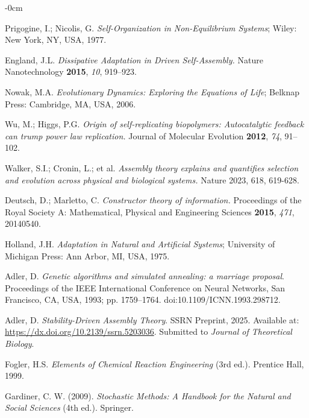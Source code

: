\documentclass[life,article,submit,pdftex,moreauthors]{Definitions/mdpi}
\begin{document}
\begin{adjustwidth}{-\extralength}{0cm}
{\begin{thebibliography}{999}
Prigogine, I.; Nicolis, G. \textit{Self-Organization in Non-Equilibrium Systems}; Wiley: New York, NY, USA, 1977.

England, J.L. \textit{Dissipative Adaptation in Driven Self-Assembly.} Nature Nanotechnology \textbf{2015}, \textit{10}, 919–923.

Nowak, M.A. \textit{Evolutionary Dynamics: Exploring the Equations of Life}; Belknap Press: Cambridge, MA, USA, 2006.


Wu, M.; Higgs, P.G. \textit{Origin of self-replicating biopolymers: Autocatalytic feedback can trump power law replication.} Journal of Molecular Evolution \textbf{2012}, \textit{74}, 91–102.

Walker, S.I.; Cronin, L.; et al. \textit{Assembly theory explains and quantifies selection and evolution across physical and biological systems.} Nature 2023, 618, 619-628.

Deutsch, D.; Marletto, C. \textit{Constructor theory of information.} Proceedings of the Royal Society A: Mathematical, Physical and Engineering Sciences \textbf{2015}, \textit{471}, 20140540.

Holland, J.H. \textit{Adaptation in Natural and Artificial Systems}; University of Michigan Press: Ann Arbor, MI, USA, 1975.

Adler, D. \textit{Genetic algorithms and simulated annealing: a marriage proposal}. Proceedings of the IEEE International Conference on Neural Networks, San Francisco, CA, USA, 1993; pp. 1759--1764. doi:10.1109/ICNN.1993.298712.

Adler, D.
\textit{Stability-Driven Assembly Theory}.
SSRN Preprint, 2025. Available at: \url{https://dx.doi.org/10.2139/ssrn.5203036}. Submitted to \textit{Journal of Theoretical Biology}.

Fogler, H.S. \textit{Elements of Chemical Reaction Engineering} (3rd ed.). Prentice Hall, 1999.

 Gardiner, C. W. (2009). \textit{Stochastic Methods: A Handbook for the Natural and Social Sciences} (4th ed.). Springer.


\end{thebibliography}}
\end{adjustwidth}
\end{document}
